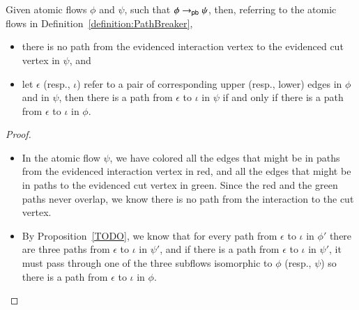 \begin{proposition}\label{proposition:PathBreak}
Given atomic flows $\phi$ and $\psi$, such that $\phi\to_{\mathsf{pb}}\psi$, then, referring to the atomic flows in Definition~\vref{definition:PathBreaker},
\begin{itemize}
 \item there is no path from the evidenced interaction vertex to the evidenced cut vertex in $\psi$, and
 \item let $\epsilon$ (resp., $\iota$) refer to a pair of corresponding upper (resp., lower) edges in $\phi$ and in $\psi$, then there is a path from $\epsilon$ to $\iota$ in $\psi$ if and only if there is a path from $\epsilon$ to $\iota$ in $\phi$.
\end{itemize}
\end{proposition}


\begin{proof}
\begin{itemize}
	\item In the atomic flow $\psi$, we have colored all the edges that might be in paths from the evidenced interaction vertex in red, and all the edges that might be in paths to the evidenced cut vertex in green. Since the red and the green paths never overlap, we know there is no path from the interaction to the cut vertex.
	\item By Proposition~\vref{TODO}, we know that for every path from $\epsilon$ to $\iota$ in $\phi'$ there are three paths from $\epsilon$ to $\iota$ in $\psi'$, and if there is a path from $\epsilon$ to $\iota$ in $\psi'$, it must pass through one of the three subflows isomorphic to $\phi$ (resp., $\psi$) so there is a path from $\epsilon$ to $\iota$ in $\phi$.
\end{itemize}
\end{proof}


